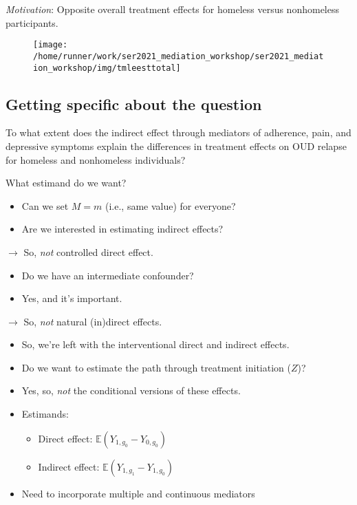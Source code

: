 \documentclass[
  12pt, krantz2,
]{book}
\providecommand{\tightlist}{%
  \setlength{\itemsep}{0pt}\setlength{\parskip}{0pt}}
\theoremstyle{definition}
\theoremstyle{definition}
\theoremstyle{definition}
\newcommand{\E}{\mathbb{E}}
\newcommand{\1}{\mathbbm{1}}
\begin{document}
\emph{Motivation}: Opposite overall treatment effects for homeless versus
nonhomeless participants.

\begin{figure}

{\centering \texttt{[image: /home/runner/work/ser2021\_mediation\_workshop/ser2021\_mediation\_workshop/img/tmleesttotal]} 

}

\end{figure}

\hypertarget{getting-specific-about-the-question}{%
\subsection{Getting specific about the question}\label{getting-specific-about-the-question}}

To what extent does the indirect effect through mediators of adherence, pain,
and depressive symptoms explain the differences in treatment effects on OUD
relapse for homeless and nonhomeless individuals?

What estimand do we want?

\begin{itemize}
\tightlist
\item
  Can we set \(M=m\) (i.e., same value) for everyone?
\item
  Are we interested in estimating indirect effects?
\end{itemize}

\(\rightarrow\) So, \emph{not} controlled direct effect.

\begin{itemize}
\tightlist
\item
  Do we have an intermediate confounder?
\item
  Yes, and it's important.
\end{itemize}

\(\rightarrow\) So, \emph{not} natural (in)direct effects.

\begin{itemize}
\tightlist
\item
  So, we're left with the interventional direct and indirect effects.
\item
  Do we want to estimate the path through treatment initiation (\(Z\))?
\item
  Yes, so, \emph{not} the conditional versions of these effects.
\item
  Estimands:

  \begin{itemize}
  \tightlist
  \item
    Direct effect: \(\E(Y_{1,g_0} - Y_{0,g_0})\)
  \item
    Indirect effect: \(\E(Y_{1,g_1} - Y_{1,g_0})\)
  \end{itemize}
\item
  Need to incorporate multiple and continuous mediators
\end{itemize}
\end{document}
